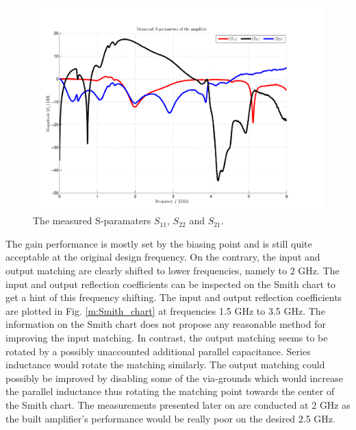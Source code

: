 \documentclass[a4paper, 12pt]{article}
\begin{document}
\begin{figure}[!h]
	\begin{center}
	\includegraphics[width=5in]{data/Measurements/sparam.pdf}
	\caption{The measured S-paramaters $S_{11}$, $S_{22}$ and $S_{21}$.}
	\label{m:S-parameters}
	\end{center}
\end{figure}

The gain performance is mostly set by the biasing point and is still quite acceptable at the original design frequency. On the contrary, the input and output matching are clearly shifted to lower frequencies, namely to 2 GHz. The input and output reflection coefficients can be inspected on the Smith chart to get a hint of this frequency shifting. The input and output reflection coefficients are plotted in Fig. \ref{m:Smith_chart} at frequencies 1.5 GHz to 3.5 GHz. The information on the Smith chart does not propose any reasonable method for improving the input matching. In contrast, the output matching seems to be rotated by a possibly unaccounted additional parallel capacitance. Series inductance would rotate the matching similarly. The output matching could possibly be improved by disabling some of the via-grounds which would increase the parallel inductance thus rotating the matching point towards the center of the Smith chart. The measurements presented later on are conducted at 2 GHz as the built amplifier's performance would be really poor on the desired 2.5 GHz.

\end{document}

